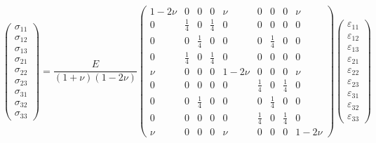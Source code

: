 \[
\begin{pmatrix}
	\sigma_{11}\\
	\sigma_{12}\\
	\sigma_{13}\\
	\sigma_{21}\\
	\sigma_{22}\\
	\sigma_{23}\\
	\sigma_{31}\\
	\sigma_{32}\\
	\sigma_{33}
\end{pmatrix}
=
\frac{E}{(1+\nu)(1-2\nu)}
\begin{pmatrix}
	1-2\nu &          0 &          0 &          0 &    \nu &          0 &          0 &          0 & \nu   \\
	     0 &\frac{1}{4} &          0 &\frac{1}{4} &      0 &          0 &          0 &          0 & 0     \\
	     0 &          0 &\frac{1}{4} &          0 &      0 &          0 &\frac{1}{4} &          0 & 0     \\
	     0 &\frac{1}{4} &          0 &\frac{1}{4} &      0 &          0 &          0 &          0 & 0     \\
	   \nu &          0 &          0 &          0 & 1-2\nu &          0 &          0 &          0 & \nu   \\
  	     0 &          0 &          0 &          0 &      0 &\frac{1}{4} &          0 &\frac{1}{4} & 0     \\
	     0 &          0 &\frac{1}{4} &          0 &      0 &          0 &\frac{1}{4} &          0 & 0     \\
	     0 &          0 &          0 &          0 &      0 &\frac{1}{4} &          0 &\frac{1}{4} & 0     \\
	   \nu &          0 &          0 &          0 &    \nu &          0 &          0 &          0 & 1-2\nu
\end{pmatrix}
\begin{pmatrix}
	\varepsilon_{11} \\
	\varepsilon_{12} \\
	\varepsilon_{13} \\
	\varepsilon_{21} \\
	\varepsilon_{22} \\
	\varepsilon_{23} \\
	\varepsilon_{31} \\
	\varepsilon_{32} \\
	\varepsilon_{33}
\end{pmatrix}
\]

